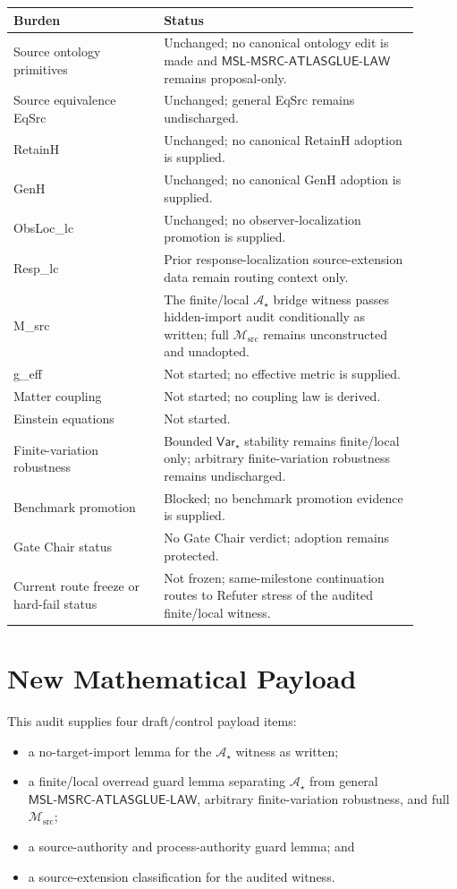 \documentclass[11pt]{article}
\newcommand{\Msrc}{\mathcal{M}_{\mathrm{src}}}
\newcommand{\MSL}{\mathsf{MSL}\mbox{-}\mathsf{MSRC}\mbox{-}\mathsf{ATLASGLUE}\mbox{-}\mathsf{LAW}}
\newcommand{\Astar}{\mathcal A_{\star}}
\newcommand{\Varstar}{\mathsf{Var}_{\star}}
\begin{document}
\begin{center}
\begin{tabular}{p{0.33\linewidth}p{0.57\linewidth}}
\hline
Burden & Status \\
\hline
Source ontology primitives & Unchanged; no canonical ontology edit is made and \(\MSL\) remains proposal-only. \\
Source equivalence EqSrc & Unchanged; general EqSrc remains undischarged. \\
RetainH & Unchanged; no canonical RetainH adoption is supplied. \\
GenH & Unchanged; no canonical GenH adoption is supplied. \\
ObsLoc\_lc & Unchanged; no observer-localization promotion is supplied. \\
Resp\_lc & Prior response-localization source-extension data remain routing context only. \\
M\_src & The finite/local \(\Astar\) bridge witness passes hidden-import audit conditionally as written; full \(\Msrc\) remains unconstructed and unadopted. \\
g\_eff & Not started; no effective metric is supplied. \\
Matter coupling & Not started; no coupling law is derived. \\
Einstein equations & Not started. \\
Finite-variation robustness & Bounded \(\Varstar\) stability remains finite/local only; arbitrary finite-variation robustness remains undischarged. \\
Benchmark promotion & Blocked; no benchmark promotion evidence is supplied. \\
Gate Chair status & No Gate Chair verdict; adoption remains protected. \\
Current route freeze or hard-fail status & Not frozen; same-milestone continuation routes to Refuter stress of the audited finite/local witness. \\
\hline
\end{tabular}
\end{center}

\section{New Mathematical Payload}

This audit supplies four draft/control payload items:
\begin{itemize}
  \item a no-target-import lemma for the \(\Astar\) witness as written;
  \item a finite/local overread guard lemma separating \(\Astar\) from
  general \(\MSL\), arbitrary finite-variation robustness, and full
  \(\Msrc\);
  \item a source-authority and process-authority guard lemma; and
  \item a source-extension classification for the audited witness.
\end{itemize}
\end{document}
